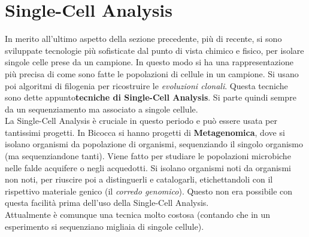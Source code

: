 \documentclass[a4paper,12pt, oneside]{book}
\begin{document}
\section{Single-Cell Analysis}
In merito all'ultimo aspetto della sezione precedente, più di recente, si sono
sviluppate tecnologie più sofisticate dal punto di vista chimico e fisico, per
isolare singole celle prese da un campione. In questo modo si ha una
rappresentazione più precisa di come sono fatte le popolazioni di cellule in un
campione. Si usano poi algoritmi di filogenia per ricostruire le
\textit{evoluzioni clonali}. Questa tecniche sono dette
appunto\textbf{tecniche di Single-Cell Analysis}. Si parte quindi sempre da un
sequenziamento ma associato a singole cellule.\\
La Single-Cell Analysis è cruciale in questo periodo e può essere usata per
tantissimi progetti. In Bicocca si hanno progetti di \textbf{Metagenomica}, dove
si isolano organismi da popolazione di organismi, sequenziando il singolo
organismo (ma sequenziandone tanti). Viene fatto per studiare le popolazioni
microbiche nelle falde acquifere o negli acquedotti. Si isolano organismi noti
da organismi non noti, per riuscire poi a distinguerli e catalogarli,
etichettandoli con il rispettivo materiale genico (il \textit{corredo
  genomico}). Questo non era possibile con questa facilità prima dell'uso della
Single-Cell Analysis. \\
Attualmente è comunque una tecnica molto costosa (contando che in un esperimento
si sequenziano migliaia di singole cellule).
\end{document}
